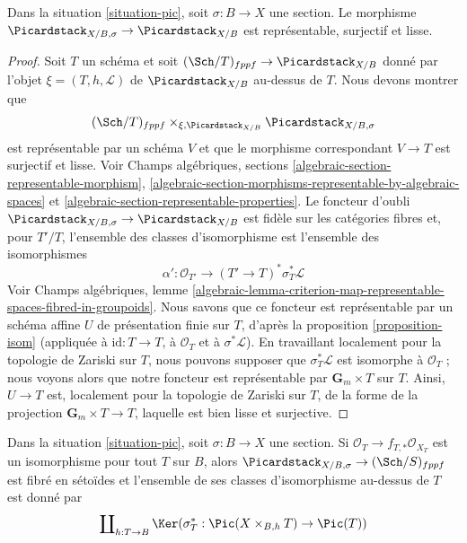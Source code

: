 \begin{lemma}
\label{lemma-compare-pic-with-section}
Dans la situation \ref{situation-pic}, soit $\sigma : B \to X$ une section.
Le morphisme $\Picardstack_{X/B, \sigma} \to \Picardstack_{X/B}$
est représentable, surjectif et lisse.
\end{lemma}

\begin{proof}
Soit $T$ un schéma et soit $(\Sch/T)_{fppf} \to \Picardstack_{X/B}$
donné par l'objet $\xi = (T, h, \mathcal{L})$ de $\Picardstack_{X/B}$
au-dessus de $T$. Nous devons montrer que
$$
(\Sch/T)_{fppf} \times_{\xi, \Picardstack_{X/B}} \Picardstack_{X/B, \sigma}
$$
est représentable par un schéma $V$ et que le morphisme correspondant
$V \to T$ est surjectif et lisse. Voir
Champs algébriques, sections \ref{algebraic-section-representable-morphism},
\ref{algebraic-section-morphisms-representable-by-algebraic-spaces} et
\ref{algebraic-section-representable-properties}.
Le foncteur d'oubli $\Picardstack_{X/B, \sigma} \to \Picardstack_{X/B}$
est fidèle sur les catégories fibres et, pour $T'/T$, l'ensemble des classes
d'isomorphisme est l'ensemble des isomorphismes
$$
\alpha' : \mathcal{O}_{T'} \longrightarrow (T' \to T)^*\sigma_T^*\mathcal{L}
$$
Voir Champs algébriques, lemme
\ref{algebraic-lemma-criterion-map-representable-spaces-fibred-in-groupoids}.
Nous savons que ce foncteur est représentable par un schéma affine $U$ de
présentation finie sur $T$, d'après la proposition \ref{proposition-isom}
(appliquée à $\text{id} : T \to T$, à $\mathcal{O}_T$ et à
$\sigma^*\mathcal{L}$). En travaillant localement pour la topologie de Zariski
sur $T$, nous pouvons supposer que $\sigma_T^*\mathcal{L}$ est isomorphe à
$\mathcal{O}_T$ ; nous voyons alors que notre foncteur est représentable par
$\mathbf{G}_m \times T$ sur $T$. Ainsi,
$U \to T$ est, localement pour la topologie de Zariski sur $T$, de la forme
de la projection $\mathbf{G}_m \times T \to T$, laquelle est bien lisse et
surjective.
\end{proof}

\begin{lemma}
\label{lemma-flat-geometrically-connected-fibres-with-section-functor-stack}
Dans la situation \ref{situation-pic}, soit $\sigma : B \to X$ une section.
Si $\mathcal{O}_T \to f_{T, *}\mathcal{O}_{X_T}$ est un isomorphisme
pour tout $T$ sur $B$, alors
$\Picardstack_{X/B, \sigma} \to (\Sch/S)_{fppf}$
est fibré en sétoïdes et l'ensemble de ses classes d'isomorphisme au-dessus de
$T$ est donné par
$$
\coprod\nolimits_{h : T \to B}
\Ker(\sigma_T^* : \Pic(X \times_{B, h} T) \to \Pic(T))
$$
\end{lemma}

